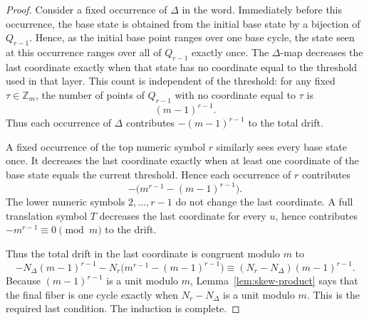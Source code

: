 \documentclass[10pt,a4paper]{amsart}
\begin{document}
\begin{proof}
Consider a fixed occurrence of \(\Delta\) in the word.  Immediately before this occurrence, the base state is obtained from the initial base state by a bijection of \(Q_{r-1}\).  Hence, as the initial base point ranges over one base cycle, the state seen at this occurrence ranges over all of \(Q_{r-1}\) exactly once.  The \(\Delta\)-map decreases the last coordinate exactly when that state has no coordinate equal to the threshold used in that layer.  This count is independent of the threshold: for any fixed \(\tau\in\mathbb Z_m\), the number of points of \(Q_{r-1}\) with no coordinate equal to \(\tau\) is
\[
(m-1)^{r-1}.
\]
Thus each occurrence of \(\Delta\) contributes \(-(m-1)^{r-1}\) to the total drift.

A fixed occurrence of the top numeric symbol \(r\) similarly sees every base state once.  It decreases the last coordinate exactly when at least one coordinate of the base state equals the current threshold.  Hence each occurrence of \(r\) contributes
\[
-\bigl(m^{r-1}-(m-1)^{r-1}\bigr).
\]
The lower numeric symbols \(2,\ldots,r-1\) do not change the last coordinate.  A full translation symbol \(T\) decreases the last coordinate for every \(u\), hence contributes \(-m^{r-1}\equiv0\pmod m\) to the drift.

Thus the total drift in the last coordinate is congruent modulo \(m\) to
\[
-N_\Delta(m-1)^{r-1}-N_r\bigl(m^{r-1}-(m-1)^{r-1}\bigr)
\equiv (N_r-N_\Delta)(m-1)^{r-1}.
\]
Because \((m-1)^{r-1}\) is a unit modulo \(m\), Lemma~\ref{lem:skew-product} says that the final
fiber is one cycle exactly when \(N_r-N_\Delta\) is a unit modulo \(m\).  This is the required last
condition.  The induction is complete.
\end{proof}
\end{document}
